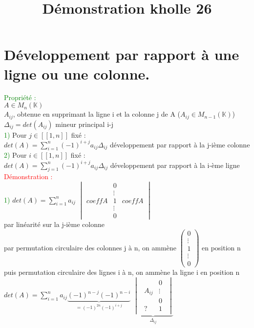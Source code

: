 \documentclass{article}
\begin{document}
\title{Démonstration kholle 26}
\date{}
\maketitle
\renewcommand{\thesection}{\Roman{section}}
\setlength{\parindent}{1.5cm}
\section{Développement par rapport à une ligne ou une colonne.}
\textcolor{green}{Propriété :} \\
$A \in M_n(\mathbb K) $ \\
$A_{ij}$, obtenue en supprimant la ligne i et la colonne j de A ($A_{ij} \in M_{n-1}(\mathbb K)$) \\
$\Delta_{ij}=det(A_{ij})$ mineur principal i-j \\
\textcolor{green}{1)} Pour $j \in [[1,n]]$ fixé : \\
$det(A)=\sum_{i=1}^n (-1)^{i+j} a_{ij} \Delta_{ij}$ développement par rapport à la j-ième colonne \\
\textcolor{green}{2)} Pour $i \in [[1,n]]$ fixé : \\
$det(A)= \sum_{j=1}^n (-1)^{i+j} a_{ij} \Delta_{ij}$ développement par rapport à la i-ème ligne \\
\textcolor{red}{Démonstration :} \\
\textcolor{green}{1)} $det(A)=\sum_{i=1}^n a_{ij}$
$\begin{vmatrix} &0 & \\ & \vdots &\\
  coeffA & 1 & coeffA \\
  & \vdots & \\
  & 0 &
\end{vmatrix}$\\
par linéarité sur la j-ième colonne \\
par permutation circulaire des colonnes j à n, on ammène $\begin{pmatrix} 0 \\ \vdots \\ 1 \\ \vdots \\ 0\end{pmatrix}$ en position n \\
  puis permutation circulaire des lignes i à n, on ammène la ligne i en position n \\
  $det(A)= \sum_{i=1}^n a_{ij} \underbrace{(-1)^{n-j} (-1)^{n-i}}_{=(-1)^{2n}(-1)^{i+j}}$ $\underbrace{\begin{vmatrix} \begin{array}{l|cr}
    & 0 \\
    A_{ij} &  \vdots \\
        & 0\\
    \hline ? & 1
      \end{array} \end{vmatrix} }_{\Delta_{ij}}$ \\
\end{document}
